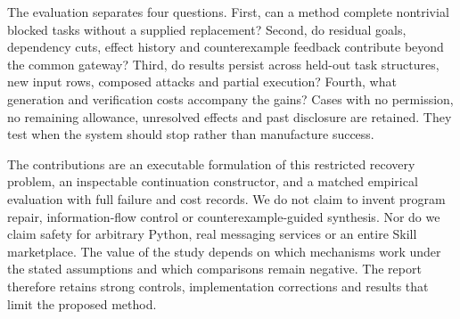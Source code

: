 The evaluation separates four questions. First, can a method complete nontrivial blocked tasks without a supplied replacement? Second, do residual goals, dependency cuts, effect history and counterexample feedback contribute beyond the common gateway? Third, do results persist across held-out task structures, new input rows, composed attacks and partial execution? Fourth, what generation and verification costs accompany the gains? Cases with no permission, no remaining allowance, unresolved effects and past disclosure are retained. They test when the system should stop rather than manufacture success.

The contributions are an executable formulation of this restricted recovery problem, an inspectable continuation constructor, and a matched empirical evaluation with full failure and cost records. We do not claim to invent program repair, information-flow control or counterexample-guided synthesis. Nor do we claim safety for arbitrary Python, real messaging services or an entire Skill marketplace. The value of the study depends on which mechanisms work under the stated assumptions and which comparisons remain negative. The report therefore retains strong controls, implementation corrections and results that limit the proposed method.
